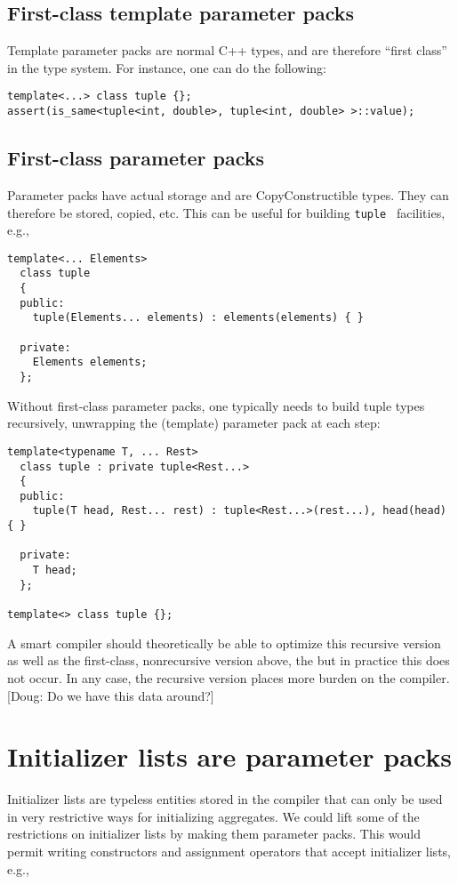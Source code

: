 \documentclass{article}
\newcommand{\comment}[2]{[{\Large\sc #1:} \textsf{#2}]}
\newcommand{\doug}[1]{\comment{Doug}{#1}}
\begin{document}
\subsection{First-class template parameter packs}
Template parameter packs are normal C++ types, and are therefore
``first class'' in the type system. For instance, one can do the
following:

\begin{verbatim}
template<...> class tuple {};
assert(is_same<tuple<int, double>, tuple<int, double> >::value);
\end{verbatim}

\subsection{First-class parameter packs}
Parameter packs have actual storage and are CopyConstructible
types. They can therefore be stored, copied, etc. This can be useful
for building \texttt{tuple}~\cite{Jarvi02} facilities, e.g.,
\begin{verbatim}
template<... Elements> 
  class tuple
  {
  public:
    tuple(Elements... elements) : elements(elements) { }

  private:
    Elements elements;
  };
\end{verbatim}

Without first-class parameter packs, one typically needs to build
tuple types recursively, unwrapping the (template) parameter pack at
each step:

\begin{verbatim}
template<typename T, ... Rest>
  class tuple : private tuple<Rest...>
  {
  public:
    tuple(T head, Rest... rest) : tuple<Rest...>(rest...), head(head) { }

  private:
    T head;
  };

template<> class tuple {};
\end{verbatim}

A smart compiler should theoretically be able to optimize this
recursive version as well as the first-class, nonrecursive version
above, the but in practice this does not occur. In any case, the
recursive version places more burden on the compiler.
\doug{Do we have this data around?}

\section{Initializer lists are parameter packs}
Initializer lists are typeless entities stored in the compiler that
can only be used in very restrictive ways for initializing
aggregates. We could lift some of the restrictions on initializer
lists by making them parameter packs. This would permit writing
constructors and assignment operators that accept initializer lists,
e.g.,
\end{document}
